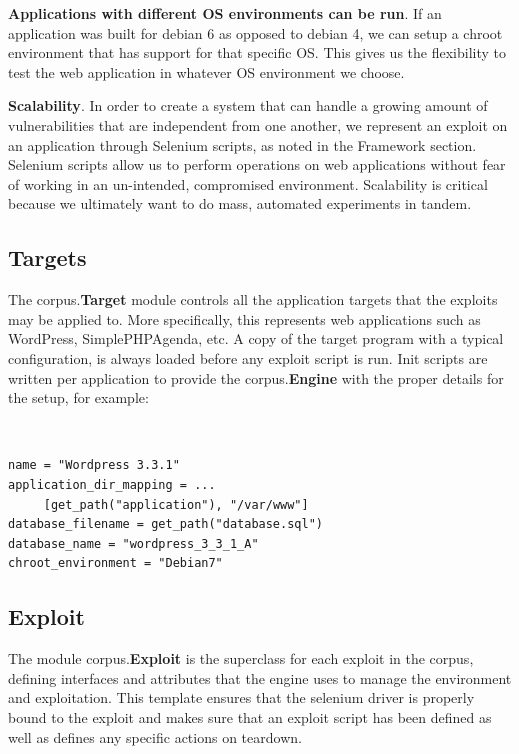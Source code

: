\documentclass[letterpaper,twocolumn,10pt]{article}
\begin{document}
{\bf Applications with different OS environments can be run}.  If an application was built for debian 6 as opposed to debian 4, we can setup a chroot environment that has support for that specific OS.  This gives us the flexibility to test the web application in whatever OS environment we choose.

{\bf Scalability}.  In order to create a system that can handle a growing amount of vulnerabilities that are independent from one another, we represent an exploit on an application through  Selenium scripts, as noted in the Framework section.  Selenium scripts allow us to perform operations on web applications without fear of working in an un-intended, compromised environment.  Scalability is critical because we ultimately want to do mass, automated experiments in tandem. \\




\subsection{Targets}

   The corpus.{\bf Target} module controls all the application targets that the exploits may be applied to.  More specifically, this represents web applications such as WordPress, SimplePHPAgenda, etc. A copy of the target program with a typical configuration, is always loaded before any exploit script is run.  Init scripts are written per application to provide the corpus.{\bf Engine} with the proper details for the setup, for example:

\begin{minipage}{\textwidth}
{\tt \footnotesize
\begin{lstlisting}
name = "Wordpress 3.3.1"
application_dir_mapping = ...
     [get_path("application"), "/var/www"]
database_filename = get_path("database.sql")
database_name = "wordpress_3_3_1_A"
chroot_environment = "Debian7"
\end{lstlisting}
} 
\end{minipage}


\subsection{Exploit}
The module corpus.{\bf Exploit} is the superclass for each exploit in the corpus, defining interfaces and attributes that the engine uses to manage the environment and exploitation.  This template ensures that the selenium driver is properly bound to the exploit and makes sure that an exploit script has been defined as well as defines any specific actions on teardown.
\end{document}
